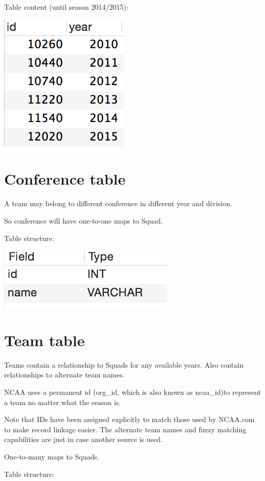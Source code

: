 \documentclass[letterpaper,10pt,english]{sphinxmanual}
\begin{document}
Table content (until season 2014/2015):

\includegraphics{season_content.png}


\section{Conference table}
\label{_static/database:conference-table}
A team may belong to different conference in different year and division.

So conference will have one-to-one maps to Squad.

Table structure:

\includegraphics{conference_table.png}


\section{Team table}
\label{_static/database:team-table}
Teams contain a relationship to Squads for any available years.
Also contain relationships to alternate team names.

NCAA uses a permanent id (org\_id, which is also known as ncaa\_id)to
represent a team no matter what the season is.

Note that IDs have been assigned explicitly to match those used by
NCAA.com to make record linkage easier. The alternate team names
and fuzzy matching capabilities are just in case another source is
used.

One-to-many maps to Squads.

Table structure:
\end{document}
